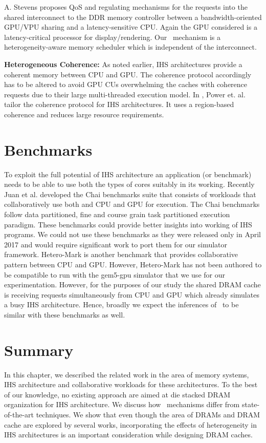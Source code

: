 A. Stevens \cite{qos-arm} proposes QoS and regulating mechanisms for the requests into the shared interconnect to the DDR memory controller between a bandwidth-oriented GPU/VPU sharing and a latency-sensitive CPU. Again the GPU considered is a latency-critical processor for display/rendering. Our \prioname\ mechanism is a heterogeneity-aware memory scheduler which is independent of the interconnect.
\par \textbf{Heterogeneous Coherence:} As noted earlier, IHS architectures provide a coherent memory between CPU and GPU. The coherence protocol accordingly has to be altered to avoid GPU CUs overwhelming the caches with coherence requests due to their large multi-threaded execution model. In \cite{hsc-coherence}, Power et. al. tailor the coherence protocol for IHS architectures. It uses a region-based coherence and reduces large resource requirements.

\section{Benchmarks} \label{related-work-benchmarks}
To exploit the full potential of IHS architecture an application (or benchmark) needs to be able to use both the types of cores suitably in its working. Recently Juan et al. developed the Chai benchmarks suite \cite{chai} that consists of workloads that collaboratively use both and CPU and GPU for execution. The Chai benchmarks follow data partitioned, fine and course grain task partitioned execution paradigm. These benchmarks could provide better insights into working of IHS programs. We could not use these benchmarks as they were released only in April 2017 and would require significant work to port them for our simulator framework. Hetero-Mark \cite{hetero-mark} is another benchmark that provides collaborative pattern between CPU and GPU. However, Hetero-Mark has not been authored to be compatible to run with the gem5-gpu simulator that we use for our experimentation. However, for the purposes of our study the shared DRAM cache is receiving requests simultaneously from CPU and GPU which already simulates a busy IHS architecture.  Hence, broadly we expect the inferences of \cachename\ to be similar with these benchmarks as well.

\section{Summary}
In this chapter, we described the related work in the area of memory systems, IHS architecture and collaborative workloads for these architectures. To the best of our knowledge, no existing approach are aimed at die stacked DRAM organization for IHS architecture. We discuss how \cachename\ mechanisms differ from state-of-the-art techniques. We show that even though the area of DRAMs and DRAM cache are explored by several works, incorporating the effects of heterogeneity in IHS architectures is an important consideration while designing DRAM caches.